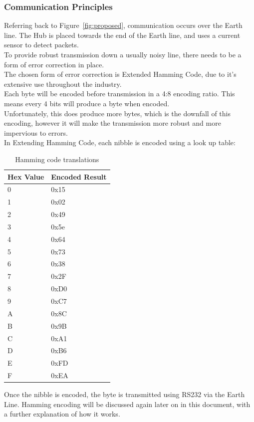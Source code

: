 \documentclass[preprint,12pt,3p]{elsarticle}
\begin{document}
\subsubsection{Communication Principles}
Referring back to Figure~\ref{fig:proposed}, communication occurs over the Earth line. The Hub is placed towards the end of the Earth line, and uses a current sensor to detect packets.\\
To provide robust transmission down a usually noisy line, there needs to be a form of error correction in place.\\
The chosen form of error correction is Extended Hamming Code, due to it's extensive use throughout the industry.\\
Each byte will be encoded before transmission in a 4:8 encoding ratio. This means every 4 bits will produce a byte when encoded.\\
Unfortunately, this does produce more bytes, which is the downfall of this encoding, however it will make the transmission more robust and more impervious to errors.\\
In Extending Hamming Code, each nibble is encoded using a look up table:

\begin{table}[H]
\centering
\resizebox{4cm}{!} {%
    \centering
    \begin{tabular}{| l | l |}
    \hline
    Hex Value & Encoded Result  \\ \hline
    0 & 0x15 \\ \hline
    1 & 0x02 \\ \hline
    2 & 0x49 \\ \hline
    3 & 0x5e \\ \hline
    4 & 0x64 \\ \hline
    5 & 0x73 \\ \hline
    6 & 0x38 \\ \hline
    7 & 0x2F \\ \hline
    8 & 0xD0 \\ \hline
    9 & 0xC7 \\ \hline
    A & 0x8C \\ \hline
    B & 0x9B \\ \hline
    C & 0xA1 \\ \hline
    D & 0xB6 \\ \hline
    E & 0xFD \\ \hline
    F & 0xEA \\ \hline
    \end{tabular}
}
\caption{Hamming code translations}
\end{table}
Once the nibble is encoded, the byte is transmitted using RS232 via the Earth Line. Hamming encoding will be discussed again later on in this document, with a further explanation of how it works.
\end{document}

